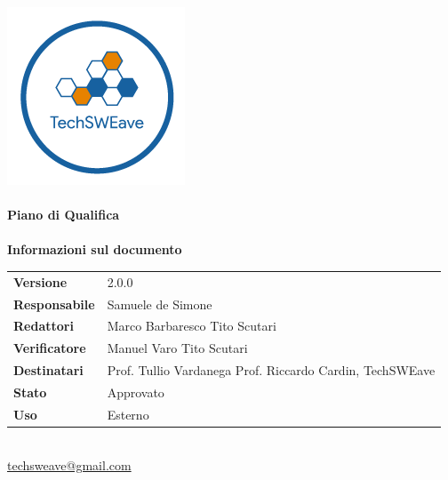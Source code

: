 \documentclass[a4paper]{article}
\begin{document}
\begin{titlepage}
    \begin{center}
        \includegraphics{../../../Images/logo}\\
        \vspace{20px}
        \textcolor{logo}{\hrulefill}\\
        \vspace{20px}
        \textbf{\huge\textcolor{logo}{Piano di Qualifica}}\\
        \vspace{10px}
        \textcolor{logo}{\hrulefill}\\
        \vspace{40px}
        \textbf{\Large Informazioni sul documento}\\
        \vspace{20px}
        \begin{tabular}{p{100px} | p{100px}}
            \textbf{Versione}     & 2.0.0                                                                      \\
            \textbf{Responsabile} & Samuele de Simone                                                          \\
            \textbf{Redattori}    & Marco Barbaresco \newline Tito Scutari                                     \\
            \textbf{Verificatore} & Manuel Varo \newline Tito Scutari                                          \\
            \textbf{Destinatari}  & Prof. Tullio Vardanega \newline Prof. Riccardo Cardin, \newline TechSWEave \\
            \textbf{Stato}        & Approvato                                                                  \\
            \textbf{Uso}          & Esterno                                                                    \\
        \end{tabular}\\
        \vspace{60px}
        \href{mailto:techsweave@gmail.com}{techsweave@gmail.com}\\

    \end{center}
\end{titlepage}
\end{document}
